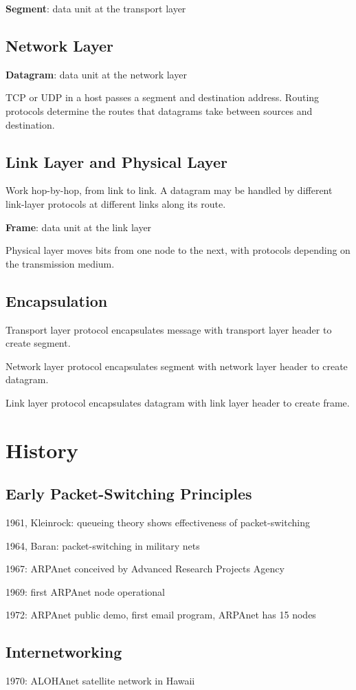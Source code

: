 \documentclass[11pt]{article}
\begin{document}
\textbf{Segment}: data unit at the transport layer
\subsection{Network Layer}
\label{sec:org7f285fa}
\textbf{Datagram}: data unit at the network layer

TCP or UDP in a host passes a segment and destination address.
Routing protocols determine the routes that datagrams take between sources and destination.
\subsection{Link Layer and Physical Layer}
\label{sec:org26d88b2}
Work hop-by-hop, from link to link.
A datagram may be handled by different link-layer protocols at different links along its route.

\textbf{Frame}: data unit at the link layer

Physical layer moves bits from one node to the next, with protocols depending on the transmission
medium.
\subsection{Encapsulation}
\label{sec:org532c937}
Transport layer protocol encapsulates message with transport layer header to create segment.

Network layer protocol encapsulates segment with network layer header to create datagram.

Link layer protocol encapsulates datagram with link layer header to create frame.
\section{History}
\label{sec:orga1f4f54}
\subsection{Early Packet-Switching Principles}
\label{sec:org6ef9964}
1961, Kleinrock: queueing theory shows effectiveness of packet-switching

1964, Baran: packet-switching in military nets

1967: ARPAnet conceived by Advanced Research Projects Agency

1969: first ARPAnet node operational

1972: ARPAnet public demo, first email program, ARPAnet has 15 nodes
\subsection{Internetworking}
\label{sec:org7a57282}
1970: ALOHAnet satellite network in Hawaii
\end{document}
